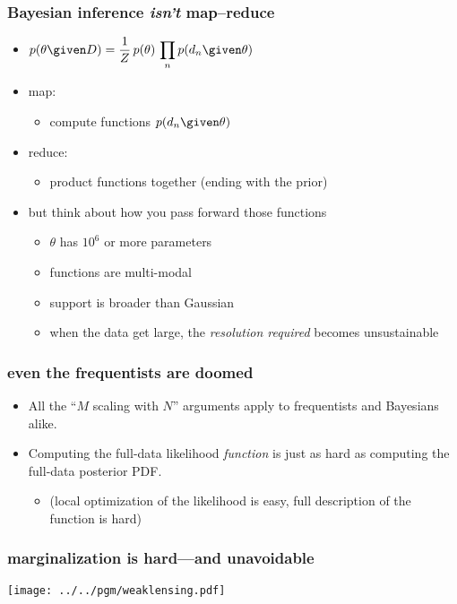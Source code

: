\documentclass[pdftex]{beamer}
\begin{document}
\begin{frame}
  \frametitle{Bayesian inference \emph{isn't} map--reduce}
  \begin{itemize}
  \item $\displaystyle p(\theta\given D) = \frac{1}{Z}\,p(\theta)\,\prod_n p(d_n\given\theta)$
  \item map:
    \begin{itemize}
    \item compute functions $p(d_n\given\theta)$
    \end{itemize}
  \item reduce:
    \begin{itemize}
    \item product functions together (ending with the prior)
    \end{itemize}
  \item but think about how you pass forward those functions
    \begin{itemize}
    \item $\theta$ has $10^6$ or more parameters
    \item functions are multi-modal
    \item support is broader than Gaussian
    \item when the data get large, the \emph{resolution required} becomes unsustainable
    \end{itemize}
  \end{itemize}
\end{frame}

\begin{frame}
  \frametitle{even the frequentists are doomed}
  \begin{itemize}
  \item All the ``$M$ scaling with $N$'' arguments apply to frequentists and Bayesians alike.
  \item Computing the full-data likelihood \emph{function} is just as hard as computing the full-data posterior PDF.
    \begin{itemize}
    \item (local optimization of the likelihood is easy, full description of the function is hard)
    \end{itemize}
  \end{itemize}
\end{frame}

\begin{frame}
  \frametitle{marginalization is hard---and unavoidable}
  \texttt{[image: ../../pgm/weaklensing.pdf]}
\end{frame}
\end{document}
